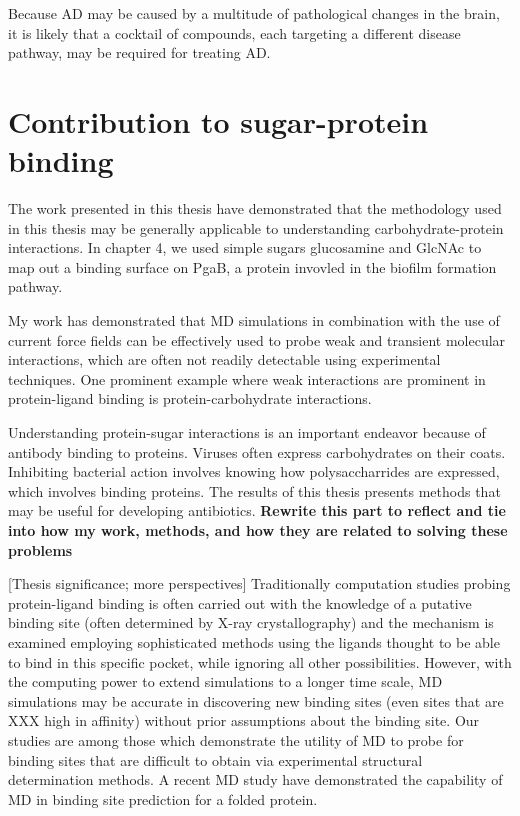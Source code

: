 Because AD may be caused by a multitude of pathological changes in the brain, it is likely that a cocktail of compounds, each targeting a different disease pathway, may be required for treating AD. %

\section{Contribution to sugar-protein binding}
The work presented in this thesis have demonstrated that the methodology used in this thesis may be generally applicable to understanding carbohydrate-protein interactions. In chapter 4, we used simple sugars glucosamine and GlcNAc to map out a binding surface on PgaB, a protein invovled in the biofilm formation pathway. 

My work has demonstrated that MD simulations in combination with the use of current force fields can be effectively used to probe weak and transient molecular interactions, which are often not readily detectable using experimental techniques. One prominent example where weak interactions are prominent in protein-ligand binding is protein-carbohydrate interactions.\cite{weak binding review paper}

Understanding protein-sugar interactions is an important endeavor because of antibody binding to proteins.  Viruses often express carbohydrates on their coats.  Inhibiting bacterial action involves knowing how polysaccharrides are expressed, which involves binding proteins.  The results of this thesis presents methods that may be useful for developing antibiotics. \textbf{Rewrite this part to reflect and tie into how my work, methods, and how they are related to solving these problems} 


[Thesis significance; more perspectives] Traditionally computation studies probing protein-ligand binding is often carried out with the knowledge of a putative binding site (often determined by X-ray crystallography) and the mechanism is examined employing sophisticated methods using the ligands thought to be able to bind in this specific pocket, while ignoring all other possibilities.  However, with the computing power to extend simulations to a longer time scale, MD simulations may be accurate in discovering new binding sites (even sites that are XXX high in affinity) without prior assumptions about the binding site. Our studies are among those which demonstrate the utility of MD to probe for binding sites that are difficult to obtain via experimental structural determination methods.  A recent MD study have demonstrated the capability of MD in binding site prediction for a folded protein.\cite{Shan:2011bo}

